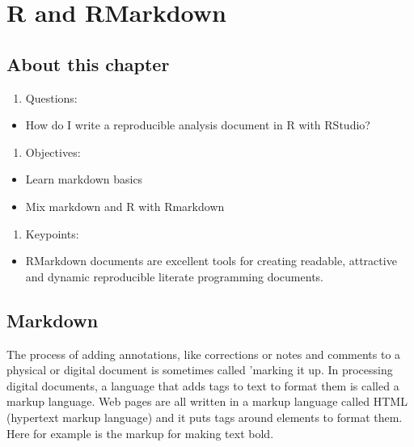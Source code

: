 \documentclass[
]{book}
\providecommand{\tightlist}{%
  \setlength{\itemsep}{0pt}\setlength{\parskip}{0pt}}
\begin{document}
\hypertarget{r-and-rmarkdown}{%
\chapter{R and RMarkdown}\label{r-and-rmarkdown}}

\hypertarget{about-this-chapter}{%
\section{About this chapter}\label{about-this-chapter}}

\begin{enumerate}
\def\labelenumi{\arabic{enumi}.}
\tightlist
\item
  Questions:
\end{enumerate}

\begin{itemize}
\tightlist
\item
  How do I write a reproducible analysis document in R with RStudio?
\end{itemize}

\begin{enumerate}
\def\labelenumi{\arabic{enumi}.}
\setcounter{enumi}{1}
\tightlist
\item
  Objectives:
\end{enumerate}

\begin{itemize}
\tightlist
\item
  Learn markdown basics
\item
  Mix markdown and R with Rmarkdown
\end{itemize}

\begin{enumerate}
\def\labelenumi{\arabic{enumi}.}
\setcounter{enumi}{2}
\tightlist
\item
  Keypoints:
\end{enumerate}

\begin{itemize}
\tightlist
\item
  RMarkdown documents are excellent tools for creating readable, attractive and dynamic reproducible literate programming documents.
\end{itemize}

\hypertarget{markdown}{%
\section{Markdown}\label{markdown}}

The process of adding annotations, like corrections or notes and comments to a physical or digital document is sometimes called 'marking it up. In processing digital documents, a language that adds tags to text to format them is called a markup language. Web pages are all written in a markup language called HTML (hypertext markup language) and it puts tags around elements to format them. Here for example is the markup for making text bold.
\end{document}
